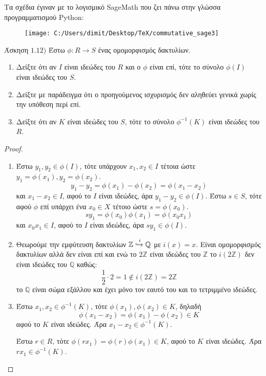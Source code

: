 \documentclass[oneside,a4paper]{article}
\newcommand {\tl}{\textlatin}
\newcommand{\Z}{\mathbb{Z}}
\newcommand{\Q}{\mathbb{Q}}
\begin{document}
\pagebreak
Τα σχέδια έγιναν με το λογισμικό \tl{SageMath} που ζει πάνω στην γλώσσα προγραμματισμού \tl{Python}:
\begin{figure}[h]
	\centering
	\texttt{[image: C:/Users/dimit/Desktop/TeX/commutative\_sage3]}
	\end{figure}
\pagebreak

\noindent Άσκηση $1.12)$
\quad Έστω $\phi:R \to S$ ένας ομομορφισμός δακτυλίων.
\begin{enumerate} 
\item Δείξτε ότι αν $I$ είναι ιδεώδες του $R$ και ο $\phi$ είναι επί, τότε το σύνολο $\phi(I)$ είναι ιδεώδες του $S$. 
\item Δείξτε με παράδειγμα ότι ο προηγούμενος ισχυρισμός δεν αληθεύει γενικά χωρίς την υπόθεση περί επί.
\item Δείξτε ότι αν $K$ είναι ιδεώδες του $S$, τότε το σύνολο $\phi^{-1}(K)$ είναι ιδεώδες του $R$.
\end{enumerate}

\begin{proof}

	$ $\newline
	\begin{enumerate}
		\item Έστω $y_1 , y_2 \in \phi (I)$, τότε υπάρχουν $x_1,x_2 \in I$ τέτοια ώστε $y_1 = \phi (x_1), y_2 = \phi (x_2)$.
		$$y_1 - y_2 = \phi (x_1) - \phi (x_2) = \phi ( x_1 - x_2)$$
		και $x_1 - x_2 \in I$, αφού το $I$ είναι ιδεώδες, άρα $y_1 - y_2 \in \phi (I)$.
		Έστω $s \in S$, τότε αφού $\phi$ επί υπάρχει ένα $x_0 \in X$ τέτοιο ώστε $s = \phi (x_0)$.
		$$sy_1 = \phi (x_0) \phi (x_1) = \phi (x_0 x_1)$$
		και $x_0 x_1 \in I$, αφού το $I$ είναι ιδεώδες, άρα $sy_1 \in \phi (I)$.
		
		\item Θεωρούμε την εμφύτευση δακτυλίων $\mathbb{Z} \xhookrightarrow{i} \Q$ με $i(x) = x$. Είναι ομομορφισμός δακτυλίων αλλά δεν είναι επί και ενώ το $2\Z$ είναι ιδεώδες του $\Z$ το $i(2\Z )$ δεν είναι ιδεώδες του $\Q$ καθώς:
		$$\frac12 \cdot 2 = 1 \not\in i(2\Z) = 2\Z$$
		το $\Q$ είναι σώμα εξάλλου και έχει μόνο τον εαυτό του και το τετριμμένο ιδεώδες. 

		\item Έστω $x_1 , x_2 \in \phi^{-1} (K)$, τότε $\phi (x_1), \phi (x_2 ) \in K$, δηλαδή 
		$$\phi (x_1 - x_2) = \phi ( x_1)  - \phi (x_2 ) \in K$$ 
		αφού το $K$ είναι ιδεώδες. Άρα $x_1 - x_2 \in \phi^{-1} (K)$.

		Έστω $r \in R$, τότε $\phi (rx_1) = \phi (r) \phi (x_1) \in K$, αφού το $K$ είναι ιδεώδες. Άρα $rx_1 \in \phi^{-1} (K)$.
	\end{enumerate}
\end{proof}
\end{document}
